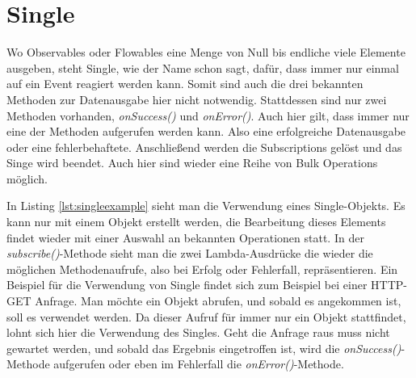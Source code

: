 \section{Single}
Wo Observables oder Flowables eine Menge von Null bis endliche viele Elemente ausgeben, steht Single, wie der Name schon sagt, dafür, dass immer nur einmal auf ein Event reagiert werden kann. Somit sind auch die drei bekannten Methoden zur Datenausgabe hier nicht notwendig. Stattdessen sind nur zwei Methoden vorhanden, \textit{onSuccess()} und \textit{onError()}. Auch hier gilt, dass immer nur eine der Methoden aufgerufen werden kann. Also eine erfolgreiche Datenausgabe oder eine fehlerbehaftete. Anschließend werden die Subscriptions gelöst und das Singe wird beendet. Auch hier sind wieder eine Reihe von Bulk Operations möglich. 

In Listing \ref{lst:singleexample} sieht man die Verwendung eines Single-Objekts. Es kann nur mit einem Objekt erstellt werden, die Bearbeitung dieses Elements findet wieder mit einer Auswahl an bekannten Operationen statt. In der \textit{subscribe()}-Methode sieht man die zwei Lambda-Ausdrücke die wieder die möglichen Methodenaufrufe, also bei Erfolg oder Fehlerfall, repräsentieren. Ein Beispiel für die Verwendung von Single findet sich zum Beispiel bei einer HTTP-GET Anfrage. Man möchte ein Objekt abrufen, und sobald es angekommen ist, soll es verwendet werden. Da dieser Aufruf für immer nur ein Objekt stattfindet, lohnt sich hier die Verwendung des Singles. Geht die Anfrage raus muss nicht gewartet werden, und sobald das Ergebnis eingetroffen ist, wird die \textit{onSuccess()}-Methode aufgerufen oder eben im Fehlerfall die \textit{onError()}-Methode. 

